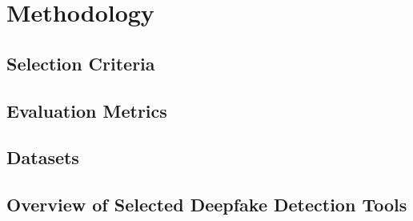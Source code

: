 
\chapter{Methodology}\label{chapter:methodology}

\section{Selection Criteria}


\section{Evaluation Metrics}
\section{Datasets}
\section{Overview of Selected Deepfake Detection Tools}